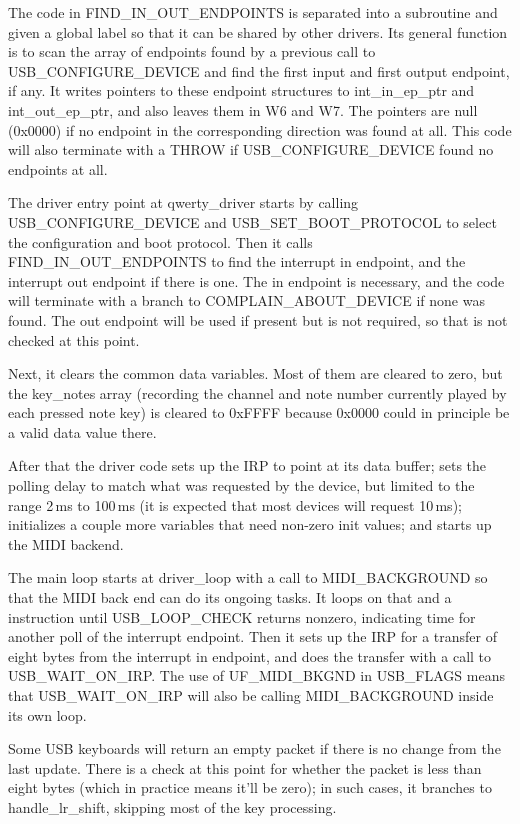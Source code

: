 The code in FIND\_IN\_OUT\_ENDPOINTS is separated into a subroutine and
given a global label so that it can be shared by other drivers.  Its general
function is to scan the array of endpoints found by a previous call to
USB\_CONFIGURE\_DEVICE and find the first input and first output endpoint,
if any.  It writes pointers to these endpoint structures to int\_in\_ep\_ptr
and int\_out\_ep\_ptr, and also leaves them in W6 and W7.  The pointers are
null (0x0000) if no endpoint in the corresponding direction was found at
all.  This code will also terminate with a THROW if USB\_CONFIGURE\_DEVICE
found no endpoints at all.

The driver entry point at qwerty\_driver starts by calling
USB\_CONFIGURE\_DEVICE and USB\_SET\_BOOT\_PROTOCOL to select the
configuration and boot protocol.  Then it calls FIND\_IN\_OUT\_ENDPOINTS to
find the interrupt in endpoint, and the interrupt out endpoint if there is
one.  The in endpoint is necessary, and the code will terminate with a
branch to COMPLAIN\_ABOUT\_DEVICE if none was found.  The out endpoint will
be used if present but is not required, so that is not checked at this
point.

Next, it clears the common data variables.  Most of them are cleared to
zero, but the key\_notes array (recording the channel and note number
currently played by each pressed note key) is cleared to 0xFFFF because
0x0000 could in principle be a valid data value there.

After that the driver code sets up the IRP to point at its data buffer; sets
the polling delay to match what was requested by the device, but limited to
the range 2\,ms to 100\,ms (it is expected that most devices will request
10\,ms); initializes a couple more variables that need non-zero init values;
and starts up the MIDI backend.

The main loop starts at driver\_loop with a call to MIDI\_BACKGROUND so that
the MIDI back end can do its ongoing tasks.  It loops on that and a
 instruction until USB\_LOOP\_CHECK returns nonzero, indicating
time for another poll of the interrupt endpoint.  Then it sets up the IRP
for a transfer of eight bytes from the interrupt in endpoint, and does the
transfer with a call to USB\_WAIT\_ON\_IRP.  The use of UF\_MIDI\_BKGND in
USB\_FLAGS means that USB\_WAIT\_ON\_IRP will also be calling MIDI\_BACKGROUND
inside its own loop.

Some USB keyboards will return an empty packet if there is no change from
the last update.  There is a check at this point for whether the packet is
less than eight bytes (which in practice means it'll be zero); in such
cases, it branches to handle\_lr\_shift, skipping most of the key
processing.

